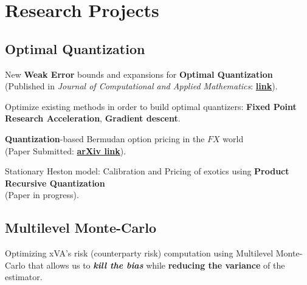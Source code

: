 \documentclass[]{deedy-resume-openfont}
\begin{document}
%
%
\lastupdated

%
%

%
%

\begin{minipage}[t]{0.33\textwidth}



	\section{Research Projects}

	\subsection{Optimal Quantization}
	\vspace{\topsep}
	\begin{tightemize}
		\item New \textbf{Weak Error} bounds and expansions for \textbf{Optimal Quantization} \\ (Published in \textit{Journal of Computational and Applied Mathematics}: \href{https://doi.org/10.1016/j.cam.2019.112670}{\textbf{link}}).
		\item Optimize existing methods in order to build optimal quantizers: \textbf{Fixed Point Research Acceleration}, \textbf{Gradient descent}.
		\item \textbf{Quantization}-based Bermudan option pricing in the $FX$ world \\ (Paper Submitted: \href{https://arxiv.org/abs/1911.05462}{\textbf{arXiv link}}).
		\item Stationary Heston model: Calibration and Pricing of exotics using \textbf{Product Recursive Quantization} \\ (Paper in progress).
	\end{tightemize}
	\sectionsep
	\subsection{Multilevel Monte-Carlo}
	\vspace{\topsep}
	\begin{tightemize}
		\item Optimizing xVA's risk (counterparty risk) computation using Multilevel Monte-Carlo that allows us to \textbf{\textit{kill the bias}} while \textbf{reducing the variance} of the estimator.
	\end{tightemize}





\end{minipage}
\end{document}
